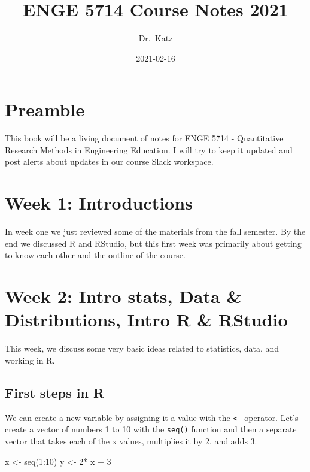 \documentclass[
]{book}
\title{ENGE 5714 Course Notes 2021}
\author{Dr.~Katz}
\date{2021-02-16}
\newenvironment{Shaded}{\begin{snugshade}}{\end{snugshade}}
\newcommand{\DecValTok}[1]{\textcolor[rgb]{0.00,0.00,0.81}{#1}}
\newcommand{\FunctionTok}[1]{\textcolor[rgb]{0.00,0.00,0.00}{#1}}
\newcommand{\NormalTok}[1]{#1}
\newcommand{\OtherTok}[1]{\textcolor[rgb]{0.56,0.35,0.01}{#1}}
\newcommand{\SpecialCharTok}[1]{\textcolor[rgb]{0.00,0.00,0.00}{#1}}
\begin{document}
\maketitle

{
\setcounter{tocdepth}{1}
\tableofcontents
}
\hypertarget{preamble}{%
\chapter*{Preamble}\label{preamble}}

This book will be a living document of notes for ENGE 5714 - Quantitative Research Methods in Engineering Education. I will try to keep it updated and post alerts about updates in our course Slack workspace.

\hypertarget{week-1-introductions}{%
\chapter{Week 1: Introductions}\label{week-1-introductions}}

In week one we just reviewed some of the materials from the fall semester. By the end we discussed R and RStudio, but this first week was primarily about getting to know each other and the outline of the course.

\hypertarget{week-2-intro-stats-data-distributions-intro-r-rstudio}{%
\chapter{Week 2: Intro stats, Data \& Distributions, Intro R \& RStudio}\label{week-2-intro-stats-data-distributions-intro-r-rstudio}}

This week, we discuss some very basic ideas related to statistics, data, and working in R.

\hypertarget{first-steps-in-r}{%
\section{First steps in R}\label{first-steps-in-r}}

We can create a new variable by assigning it a value with the \texttt{\textless{}-} operator. Let's create a vector of numbers 1 to 10 with the \texttt{seq()} function and then a separate vector that takes each of the x values, multiplies it by 2, and adds 3.

\begin{Shaded}
\begin{Highlighting}[]
\NormalTok{x }\OtherTok{\textless{}{-}} \FunctionTok{seq}\NormalTok{(}\DecValTok{1}\SpecialCharTok{:}\DecValTok{10}\NormalTok{)}
\NormalTok{y }\OtherTok{\textless{}{-}} \DecValTok{2}\SpecialCharTok{*}\NormalTok{ x }\SpecialCharTok{+} \DecValTok{3}
\end{Highlighting}
\end{Shaded}
\end{document}

